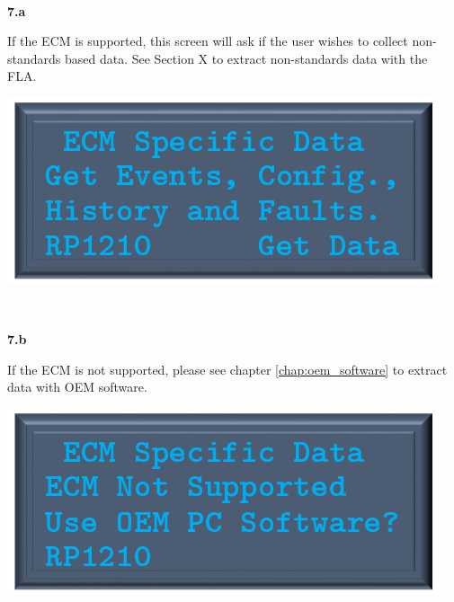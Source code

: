 \documentclass[11pt, oneside]{book}
\begin{document}
\\[\baselineskip]
\noindent\begin{minipage}{0.45\textwidth}%
\begin{center}
\textbf{7.a}\\[\baselineskip]
\end{center}
If the ECM is supported, this screen will ask if the user wishes to collect non-standards based data. See Section X to extract non-standards data with the FLA.
\end{minipage}%
\hfill%
\begin{minipage}{0.45\textwidth}
\includegraphics[width=\linewidth]{../media/pstricks_files/16_ecm_specific_supported}
\end{minipage}
\\[\baselineskip]
\noindent\begin{minipage}{0.45\textwidth}%
\begin{center}
\textbf{7.b}\\[\baselineskip]
\end{center}
If the ECM is not supported, please see chapter \ref{chap:oem_software} to extract data with OEM software.
\end{minipage}%
\hfill%
\begin{minipage}{0.45\textwidth}
\includegraphics[width=\linewidth]{../media/pstricks_files/16_ecm_specific_data}
\end{minipage}
\end{document}
